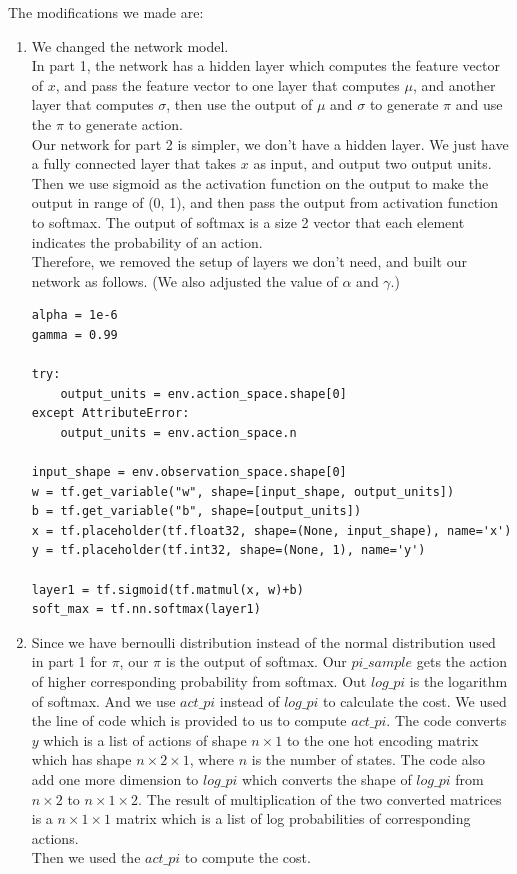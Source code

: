 \documentclass[11pt,twoside]{article}
\begin{document}
The modifications we made are:
\begin{enumerate}
\item We changed the network model.\\
In part 1, the network has a hidden layer which computes the feature vector of $x$, and pass the feature vector to one layer that computes $\mu$, and another layer that computes $\sigma$, then use the output of $\mu$ and $\sigma$ to generate $\pi$ and use the $\pi$ to generate action.\\
Our network for part 2 is simpler, we don't have a hidden layer. We just have a fully connected layer that takes $x$ as input, and output two output units. Then we use sigmoid as the activation function on the output to make the output in range of (0, 1), and then pass the output from activation function to softmax. The output of softmax is a size 2 vector that each element indicates the probability of an action.\\
Therefore, we removed the setup of layers we don't need, and built our network as follows. (We also adjusted the value of $\alpha$ and $\gamma$.)
\begin{lstlisting}
alpha = 1e-6
gamma = 0.99

try:
    output_units = env.action_space.shape[0]
except AttributeError:
    output_units = env.action_space.n

input_shape = env.observation_space.shape[0]
w = tf.get_variable("w", shape=[input_shape, output_units])
b = tf.get_variable("b", shape=[output_units])
x = tf.placeholder(tf.float32, shape=(None, input_shape), name='x')
y = tf.placeholder(tf.int32, shape=(None, 1), name='y')

layer1 = tf.sigmoid(tf.matmul(x, w)+b)
soft_max = tf.nn.softmax(layer1)
\end{lstlisting}

\item Since we have bernoulli distribution instead of the normal distribution used in part 1 for $\pi$, our $\pi$ is the output of softmax. Our $pi\_sample$ gets the action of higher corresponding probability from softmax. Out $log\_pi$ is the logarithm of softmax. And we use $act\_pi$ instead of $log\_pi$ to calculate the cost. We used the line of code which is provided to us to compute $act\_pi$. The code converts $y$ which is a list of actions of shape $n \times 1$ to the one hot encoding matrix which has shape $n \times 2 \times 1$, where $n$ is the number of states. The code also add one more dimension to $log\_pi$ which converts the shape of $log\_pi$ from $n \times 2$ to $n \times 1 \times 2$. The result of multiplication of the two converted matrices is a $n \times 1 \times 1$ matrix which is a list of log probabilities of corresponding actions.\\
Then we used the $act\_pi$ to compute the cost.


\end{enumerate}
\end{document}

